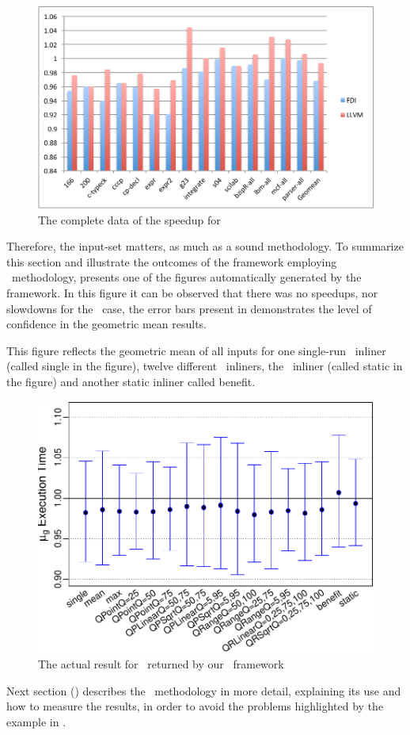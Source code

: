 \begin{figure}
  \centering
  \includegraphics[width=1.00\linewidth]{Figures/speedupgccall}
  \caption{The complete data of the speedup for \gcc}
  \label{fig:gccall}
\end{figure}

Therefore, the input-set matters, as much as a sound methodology. To summarize this section and illustrate the outcomes of the framework employing \CP\ methodology,  presents one of the figures automatically generated by the framework. In this figure it can be observed that there was no speedups, nor slowdowns for the \gcc\ case, the error bars present in  demonstrates the level of confidence in the geometric mean results.

This figure reflects the geometric mean of all inputs for one single-run \FDI\ inliner (called single in the figure), twelve different \FDI\ inliners, the \llvm\ inliner (called static in the figure) and another static inliner called benefit.

\begin{figure}
  \centering
  \includegraphics[width=1.00\linewidth]{Figures/gcc-results}
  \caption{The actual result for \gcc\ returned by our \CP\ framework}
  \label{fig:gcc-results}
\end{figure}


Next section () describes the \CP\ methodology in more detail, explaining its use and how to measure the results, in order to avoid the problems highlighted by the example in .
